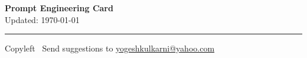 



\begin{center}
     \Large{\textbf{Prompt Engineering Card}}  \\ \small Updated: \today 
\end{center}

\raggedright
\small
\begin{multicols}{3}





\vspace{2mm}

\rule{0.3\linewidth}{0.25pt}

\scriptsize
Copyleft \textcopyleft\  Send suggestions to 
\href{http://www.yogeshkulkarni.com}{yogeshkulkarni@yahoo.com}

\end{multicols}

